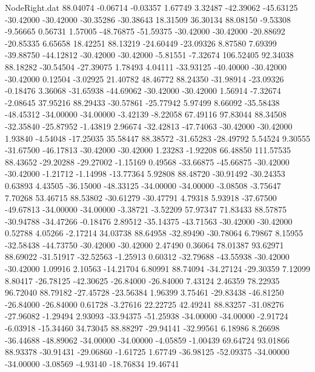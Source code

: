 \begin{filecontents}{NodeRight.dat}
  88.04074   -0.06714   -0.03357     1.67749    3.32487  -42.39062  -45.63125  -30.42000  -30.42000  -30.35286  -30.38643   18.31509   36.30134
  88.08150   -9.53308   -9.56665     0.56731    1.57005  -48.76875  -51.59375  -30.42000  -30.42000  -20.88692  -20.85335    6.65658   18.42251
  88.13219  -24.60449  -23.09326     8.87580    7.69399  -39.88750  -44.12812  -30.42000  -30.42000   -5.81551   -7.32674  106.52405   92.34038
  88.18282  -30.54504  -27.39075     1.78493    4.04111  -33.93125  -40.40000  -30.42000  -30.42000    0.12504   -3.02925   21.40782   48.46772
  88.24350  -31.98914  -23.09326    -0.18476    3.36068  -31.65938  -44.69062  -30.42000  -30.42000    1.56914   -7.32674   -2.08645   37.95216
  88.29433  -30.57861  -25.77942     5.97499    8.66092  -35.58438  -48.45312  -34.00000  -34.00000   -3.42139   -8.22058   67.49116   97.83044
  88.34508  -32.35840  -25.87952    -1.43819    2.96674  -32.42813  -47.74063  -30.42000  -30.42000    1.93840   -4.54048  -17.25035   35.58447
  88.38572  -31.65283  -28.49792     5.54524    9.30555  -31.67500  -46.17813  -30.42000  -30.42000    1.23283   -1.92208   66.48850  111.57535
  88.43652  -29.20288  -29.27002    -1.15169    0.49568  -33.66875  -45.66875  -30.42000  -30.42000   -1.21712   -1.14998  -13.77364    5.92808
  88.48720  -30.91492  -30.24353     0.63893    4.43505  -36.15000  -48.33125  -34.00000  -34.00000   -3.08508   -3.75647    7.70268   53.46715
  88.53802  -30.61279  -30.47791     4.79318    5.93918  -37.67500  -49.67813  -34.00000  -34.00000   -3.38721   -3.52209   57.97347   71.83433
  88.57875  -30.94788  -34.47266    -0.18476    2.89512  -35.14375  -43.71563  -30.42000  -30.42000    0.52788    4.05266   -2.17214   34.03738
  88.64958  -32.89490  -30.78064     6.79867    8.15955  -32.58438  -44.73750  -30.42000  -30.42000    2.47490    0.36064   78.01387   93.62971
  88.69022  -31.51917  -32.52563    -1.25913    0.60312  -32.79688  -43.55938  -30.42000  -30.42000    1.09916    2.10563  -14.21704    6.80991
  88.74094  -34.27124  -29.30359     7.12099    8.80417  -26.78125  -42.30625  -26.84000  -26.84000    7.43124    2.46359   78.22935   96.72040
  88.79182  -27.45728  -23.56384     1.96399    3.75461  -29.83438  -46.81250  -26.84000  -26.84000    0.61728   -3.27616   22.22725   42.49241
  88.83257  -31.08276  -27.96082    -1.29494    2.93093  -33.94375  -51.25938  -34.00000  -34.00000   -2.91724   -6.03918  -15.34460   34.73045
  88.88297  -29.94141  -32.99561     6.18986    8.26698  -36.44688  -48.89062  -34.00000  -34.00000   -4.05859   -1.00439   69.64724   93.01866
  88.93378  -30.91431  -29.06860    -1.61725    1.67749  -36.98125  -52.09375  -34.00000  -34.00000   -3.08569   -4.93140  -18.76834   19.46741

\end{filecontents}
